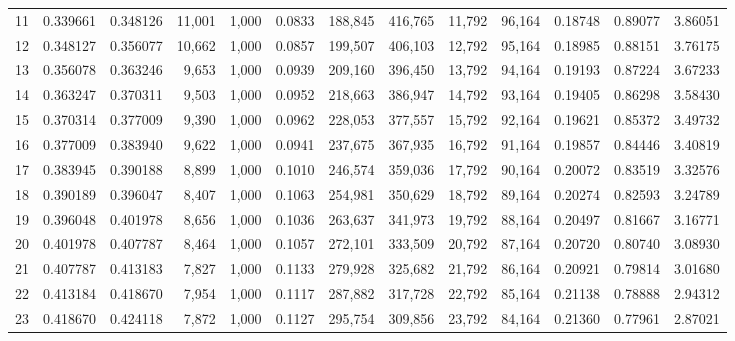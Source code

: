 \begin{tabular}{rrrrrrrrrrrrr}
11  &  0.339661 &  0.348126 &  11,001 &  1,000 &                                     0.0833 &  188,845 &  416,765 &   11,792 &   96,164 &  0.18748 &  0.89077 &  3.86051 \\
12  &  0.348127 &  0.356077 &  10,662 &  1,000 &                                     0.0857 &  199,507 &  406,103 &   12,792 &   95,164 &  0.18985 &  0.88151 &  3.76175 \\
13  &  0.356078 &  0.363246 &   9,653 &  1,000 &                                     0.0939 &  209,160 &  396,450 &   13,792 &   94,164 &  0.19193 &  0.87224 &  3.67233 \\
14  &  0.363247 &  0.370311 &   9,503 &  1,000 &                                     0.0952 &  218,663 &  386,947 &   14,792 &   93,164 &  0.19405 &  0.86298 &  3.58430 \\
15  &  0.370314 &  0.377009 &   9,390 &  1,000 &                                     0.0962 &  228,053 &  377,557 &   15,792 &   92,164 &  0.19621 &  0.85372 &  3.49732 \\
16  &  0.377009 &  0.383940 &   9,622 &  1,000 &                                     0.0941 &  237,675 &  367,935 &   16,792 &   91,164 &  0.19857 &  0.84446 &  3.40819 \\
17  &  0.383945 &  0.390188 &   8,899 &  1,000 &                                     0.1010 &  246,574 &  359,036 &   17,792 &   90,164 &  0.20072 &  0.83519 &  3.32576 \\
18  &  0.390189 &  0.396047 &   8,407 &  1,000 &                                     0.1063 &  254,981 &  350,629 &   18,792 &   89,164 &  0.20274 &  0.82593 &  3.24789 \\
19  &  0.396048 &  0.401978 &   8,656 &  1,000 &                                     0.1036 &  263,637 &  341,973 &   19,792 &   88,164 &  0.20497 &  0.81667 &  3.16771 \\
20  &  0.401978 &  0.407787 &   8,464 &  1,000 &                                     0.1057 &  272,101 &  333,509 &   20,792 &   87,164 &  0.20720 &  0.80740 &  3.08930 \\
21  &  0.407787 &  0.413183 &   7,827 &  1,000 &                                     0.1133 &  279,928 &  325,682 &   21,792 &   86,164 &  0.20921 &  0.79814 &  3.01680 \\
22  &  0.413184 &  0.418670 &   7,954 &  1,000 &                                     0.1117 &  287,882 &  317,728 &   22,792 &   85,164 &  0.21138 &  0.78888 &  2.94312 \\
23  &  0.418670 &  0.424118 &   7,872 &  1,000 &                                     0.1127 &  295,754 &  309,856 &   23,792 &   84,164 &  0.21360 &  0.77961 &  2.87021 \\

\end{tabular}
